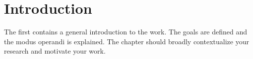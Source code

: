 \chapter{Introduction}
\label{cha:intro}
The first contains a general introduction to the work. The goals are
defined and the modus operandi is explained.
The chapter should broadly contextualize your research and motivate your work.





